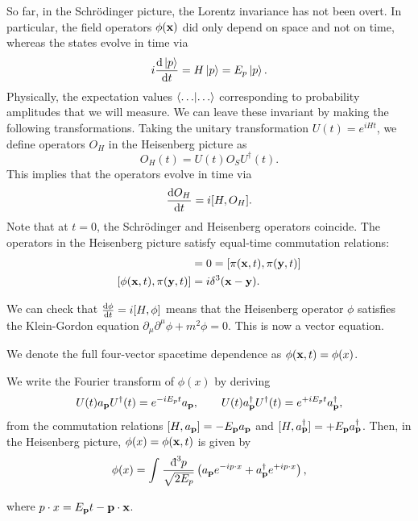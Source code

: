 So far, in the Schrödinger picture, the Lorentz invariance has not been overt. In particular, the field operators $\phi(\vb{x})$ did only depend on space and not on time, whereas the states evolve in time via
\begin{equation}
  i \dv{\ket{p}}{t} = H \ket{p} = E_p \ket{p}.
\end{equation}
Physically, the expectation values $\bra{ \dots } \ket{\dots }$ corresponding to probability amplitudes that we will measure. We can leave these invariant by making the following transformations.
Taking the unitary transformation $U(t) = e^{iHt}$, we define operators $O_H$ in the Heisenberg picture as
\begin{equation}
  O_H(t) = U(t) O_S U^{\dagger}(t).
\end{equation}
This implies that the operators evolve in time via
\begin{equation}
  \dv{O_H}{t} = i [H, O_H].
\end{equation}
Note that at $t = 0$, the Schrödinger and Heisenberg operators coincide.
The operators in the Heisenberg picture satisfy equal-time commutation relations:
\begin{align}
  [\phi(\vb{x}, t), \phi(\vb{y}, t) ] &= 0 = [\pi(\vb{x}, t), \pi(\vb{y}, t)] \\
  [\phi(\vb{x}, t), \pi(\vb{y}, t)] &= i \delta^3(\vb{x} - \vb{y}).
\end{align}
\begin{exercise}
  We can check that $\dv{\phi}{t} = i [H, \phi]$ means that the Heisenberg operator $\phi$ satisfies the Klein-Gordon equation $\partial_\mu \partial^\mu \phi + m^2 \phi = 0$. This is now a vector equation.
\end{exercise}
\begin{notation}[]
  We denote the full four-vector spacetime dependence as $\phi(\vb{x}, t) = \phi(x)$.
\end{notation}
We write the Fourier transform of $\phi(x)$ by deriving
\begin{equation}
  U(t) a_{\vb{p}} U^{\dagger}(t) = e^{-iE_p t} a_{\vb{p}}, \qquad
  U(t) a^{\dagger}_{\vb{p}} U^{\dagger}(t) = e^{+iE_p t} a^{\dagger}_{\vb{p}},
\end{equation}
from the commutation relations $[H, a_{\vb{p}}] = -E_{\vb{p}} a_{\vb{p}}$ and $[H, a_{\vb{p}}^{\dagger}] = + E_{\vb{p}} a_{\vb{p}}^{\dagger}$.
Then, in the Heisenberg picture, $\phi(x) = \phi(\vb{x}, t)$ is given by
\begin{equation}
  \phi(x) = \int_{}^{} \frac{\bdd[3]{p}}{\sqrt{2E_p}} \left( a_{\vb{p}} e^{-ip \cdot x} + a_{\vb{p}}^{\dagger} e^{+i p \cdot x} \right),
\end{equation}

where $p \cdot x = E_{\vb{p}} t - \vb{p} \cdot \vb{x}$.
